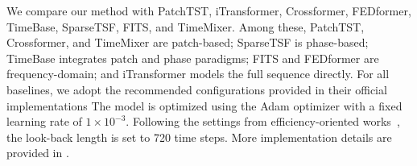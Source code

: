 We compare our method with {PatchTST}\citeyearpar{nie2023patchtst}, {iTransformer}\citeyearpar{liu2023itransformer}, {Crossformer}\citeyearpar{zhang2023crossformer}, {FEDformer}\citeyearpar{zhou2022fedformer}, {TimeBase}\citeyearpar{huang2025timebase}, {SparseTSF}\citeyearpar{lin2024sparsetsf}, {FITS}\citeyearpar{fits2024}, and {TimeMixer}\citeyearpar{timemixer24}.
Among these, PatchTST, Crossformer, and TimeMixer are patch-based; SparseTSF is phase-based; TimeBase integrates patch and phase paradigms; FITS and FEDformer are frequency-domain; and iTransformer models the full sequence directly.
For all baselines, we adopt the recommended configurations provided in their official implementations
The model is optimized using the Adam optimizer with a fixed learning rate of $1 \times 10^{-3}$.  
Following the settings from efficiency-oriented works~\citep{huang2025timebase, lin2024sparsetsf, fits2024}, the look-back length is set to 720 time steps.
More implementation details are provided in .



